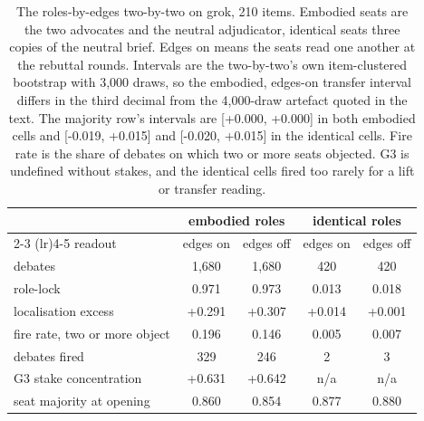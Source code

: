 \begin{table}[t]
\centering
\caption{The roles-by-edges two-by-two on grok, 210 items. Embodied seats
are the two advocates and the neutral adjudicator, identical seats three
copies of the neutral brief. Edges on means the seats read one another at the
rebuttal rounds. Intervals are the two-by-two's own item-clustered bootstrap
with 3,000 draws, so the embodied, edges-on transfer interval differs in the
third decimal from the 4,000-draw artefact quoted in the text. The majority
row's intervals are [+0.000, +0.000] in both embodied cells and
[-0.019, +0.015] and [-0.020, +0.015] in the identical cells.
Fire rate is the share of debates on which two or more seats objected. G3 is
undefined without stakes, and the identical cells fired too rarely for a
lift or transfer reading.}
\label{tab-topology}
\footnotesize
\setlength{\tabcolsep}{2.5pt}
\begin{tabular}{lcccc}
\toprule
 & \multicolumn{2}{c}{embodied roles} & \multicolumn{2}{c}{identical roles} \\
\cmidrule(lr){2-3} \cmidrule(lr){4-5}
readout & edges on & edges off & edges on & edges off \\
\midrule
debates                        & 1,680 & 1,680 & 420 & 420 \\ %
role-lock                      & 0.971 & 0.973 & 0.013 & 0.018 \\ %
localisation excess            & +0.291 & +0.307 & +0.014 & +0.001 \\ %
fire rate, two or more object  & 0.196 & 0.146 & 0.005 & 0.007 \\ %
debates fired                  & 329 & 246 & 2 & 3 \\ %
G3 stake concentration         & +0.631 & +0.642 & n/a & n/a \\ %
seat majority at opening       & 0.860 & 0.854 & 0.877 & 0.880 \\ %

\end{tabular}
\end{table}
